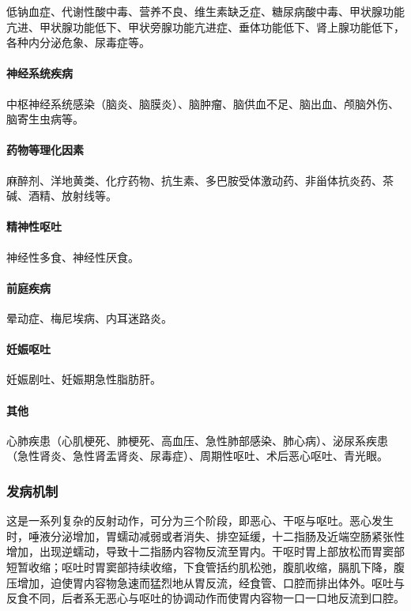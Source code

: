 低钠血症、代谢性酸中毒、营养不良、维生素缺乏症、糖尿病酸中毒、甲状腺功能亢进、甲状腺功能低下、甲状旁腺功能亢进症、垂体功能低下、肾上腺功能低下，各种内分泌危象、尿毒症等。

\paragraph{神经系统疾病}

中枢神经系统感染（脑炎、脑膜炎）、脑肿瘤、脑供血不足、脑出血、颅脑外伤、脑寄生虫病等。

\paragraph{药物等理化因素}

麻醉剂、洋地黄类、化疗药物、抗生素、多巴胺受体激动药、非甾体抗炎药、茶碱、酒精、放射线等。

\paragraph{精神性呕吐}

神经性多食、神经性厌食。

\paragraph{前庭疾病}

晕动症、梅尼埃病、内耳迷路炎。

\paragraph{妊娠呕吐}

妊娠剧吐、妊娠期急性脂肪肝。

\paragraph{其他}

心肺疾患（心肌梗死、肺梗死、高血压、急性肺部感染、肺心病）、泌尿系疾患（急性肾炎、急性肾盂肾炎、尿毒症）、周期性呕吐、术后恶心呕吐、青光眼。

\subsubsection{发病机制}

这是一系列复杂的反射动作，可分为三个阶段，即恶心、干呕与呕吐。恶心发生时，唾液分泌增加，胃蠕动减弱或者消失、排空延缓，十二指肠及近端空肠紧张性增加，出现逆蠕动，导致十二指肠内容物反流至胃内。干呕时胃上部放松而胃窦部短暂收缩；呕吐时胃窦部持续收缩，下食管括约肌松弛，腹肌收缩，膈肌下降，腹压增加，迫使胃内容物急速而猛烈地从胃反流，经食管、口腔而排出体外。呕吐与反食不同，后者系无恶心与呕吐的协调动作而使胃内容物一口一口地反流到口腔。

